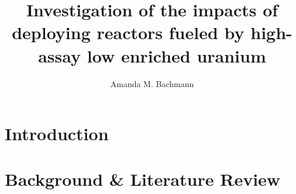 \documentclass[edeposit,fullpage]{uiucthesis2018}
\title{Investigation of the impacts of deploying reactors fueled by high-assay low enriched uranium}
\author{Amanda M. Bachmann}
\begin{document}
\maketitle

\frontmatter
\begin{abstract}



\end{abstract}


%


\tableofcontents
\listoftables
\listoffigures


\pagebreak
\mainmatter

\chapter{Introduction} \label{ch:intro}


\chapter{Background \& Literature Review} \label{ch:background}

\end{document}
